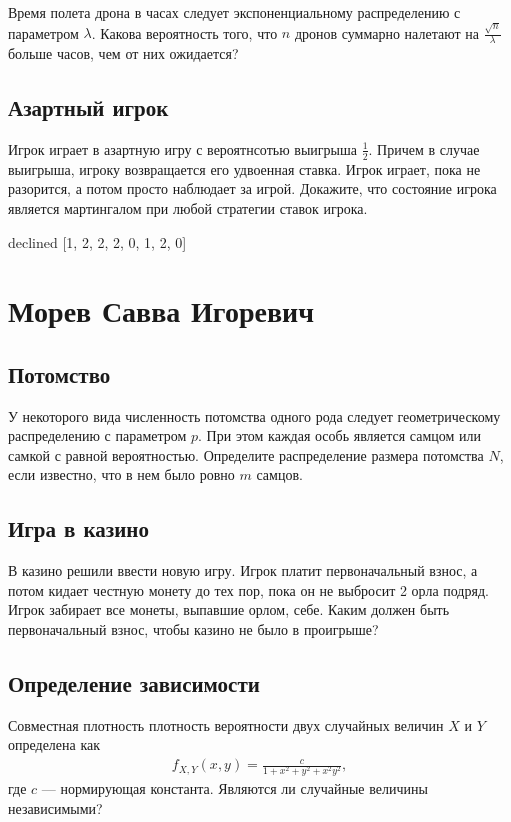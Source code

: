 \documentclass[12pt]{article}
\begin{document}
Время полета дрона в часах следует экспоненциальному распределению с параметром $\lambda$. Какова вероятность того, что $n$ дронов суммарно налетают на $\frac{\sqrt{n}}{\lambda}$ больше часов, чем от них ожидается?



\subsection{Азартный игрок}

Игрок играет в азартную игру с вероятнсотью выигрыша $\frac{1}{2}$. Причем в случае выигрыша, игроку возвращается его удвоенная ставка. Игрок играет, пока не разорится, а потом просто наблюдает за игрой. Докажите, что состояние игрока является мартингалом при любой стратегии ставок игрока.



\newpage
declined  [1, 2, 2, 2, 0, 1, 2, 0]
\section{Морев Савва Игоревич}

\subsection{Потомство}

У некоторого вида численность потомства одного рода следует геометрическому распределению с параметром $p$. При этом каждая особь является самцом или самкой с равной вероятностью. Определите распределение размера потомства $N$, если известно, что в нем было ровно $m$ самцов.



\subsection{Игра в казино}

В казино решили ввести новую игру. Игрок платит первоначальный взнос, а потом кидает честную монету до тех пор, пока он не выбросит 2 орла подряд. Игрок забирает все монеты, выпавшие орлом, себе. Каким должен быть первоначальный взнос, чтобы казино не было в проигрыше?



\subsection{Определение зависимости}

Совместная плотность плотность вероятности двух случайных величин $X$ и $Y$ определена как
\begin{align*}
    f_{X, Y}(x, y) = \frac{c}{1 + x^2 + y^2 + x^2y^2},
\end{align*}
где $c$ --- нормирующая константа. Являются ли случайные величины независимыми?
\end{document}
